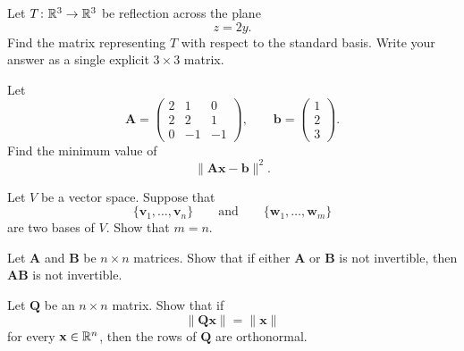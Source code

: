 \documentclass[11pt,oneside]{article}
\begin{document}
\begin{problem}
Let $T\colon \mathbb{R}^3\to\mathbb{R}^3$ be reflection across the plane
\[
z=2y.
\]
Find the matrix representing $T$ with respect to the standard basis. Write your answer as a single explicit $3\times3$ matrix.
\end{problem}

\begin{problem}
Let
\[
\mathbf A=
\begin{pmatrix}
2&1&0\\
2&2&1\\
0&-1&-1
\end{pmatrix},
\qquad
\mathbf b=
\begin{pmatrix}
1\\2\\3
\end{pmatrix}.
\]
Find the minimum value of
\[
\|\mathbf A\mathbf x-\mathbf b\|^2.
\]
\end{problem}

\begin{problem}
Let $V$ be a vector space. Suppose that
\[
\{\mathbf v_1,\dots,\mathbf v_n\}
\qquad\text{and}\qquad
\{\mathbf w_1,\dots,\mathbf w_m\}
\]
are two bases of $V$. Show that $m=n$.
\end{problem}

\begin{problem}
Let $\mathbf A$ and $\mathbf B$ be $n\times n$ matrices. Show that if either $\mathbf A$ or $\mathbf B$ is not invertible, then $\mathbf A\mathbf B$ is not invertible.
\end{problem}

\begin{problem}
Let $\mathbf Q$ be an $n\times n$ matrix. Show that if
\[
\|\mathbf Q\mathbf x\|=\|\mathbf x\|
\]
for every $\mathbf x\in\mathbb{R}^n$, then the rows of $\mathbf Q$ are orthonormal.
\end{problem}
\end{document}
